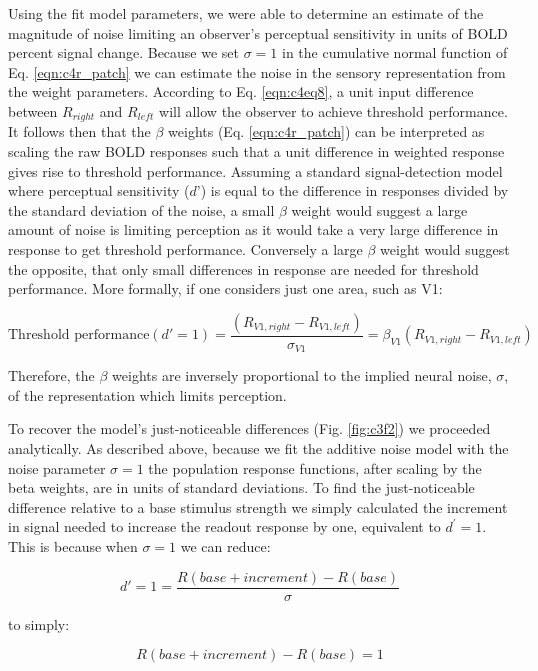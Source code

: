 Using the fit model parameters, we were able to determine an estimate of the magnitude of noise limiting an observer’s perceptual sensitivity in units of BOLD percent signal change. Because we set $\sigma=1$ in the cumulative normal function of Eq. \ref{eqn:c4r_patch} we can estimate the noise in the sensory representation from the weight parameters. According to Eq. \ref{eqn:c4eq8}, a unit input difference between $R_{right}$ and $R_{left}$ will allow the observer to achieve threshold performance. It follows then that the $\beta$ weights (Eq. \ref{eqn:c4r_patch}) can be interpreted as scaling the raw BOLD responses such that a unit difference in weighted response gives rise to threshold performance. Assuming a standard signal-detection model where perceptual sensitivity ($d’$) is equal to the difference in responses divided by the standard deviation of the noise, a small $\beta$ weight would suggest a large amount of noise is limiting perception as it would take a very large difference in response to get threshold performance. Conversely a large $\beta$ weight would suggest the opposite, that only small differences in response are needed for threshold performance. More formally, if one considers just one area, such as V1: 

\begin{equation}
    \text{Threshold performance} (d'=1) = \frac{(R_{V1,right}-R_{V1,left})}{\sigma_{V1}} = \beta_{V1}(R_{V1,right}-R_{V1,left})
\end{equation}

Therefore, the $\beta$ weights are inversely proportional to the implied neural noise, $\sigma$, of the representation which limits perception.

To recover the model's just-noticeable differences (Fig. \ref{fig:c3f2}) we proceeded analytically. As described above, because we fit the additive noise model with the noise parameter $\sigma=1$ the population response functions, after scaling by the beta weights, are in units of standard deviations. To find the just-noticeable difference relative to a base stimulus strength we simply calculated the increment in signal needed to increase the readout response by one, equivalent to $d^'=1$. This is because when $\sigma=1$ we can reduce:

\begin{equation}
    d' = 1 = \frac{R(base+increment)-R(base)}{\sigma}
\end{equation}

to simply:
 
\begin{equation}
    R(base+increment)-R(base)=1
\end{equation}

